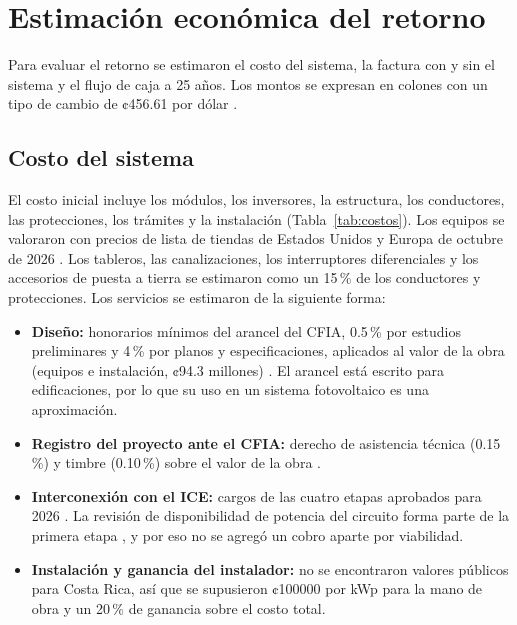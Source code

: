 \section{Estimación económica del retorno}\label{sec:economia}

Para evaluar el retorno se estimaron el costo del sistema, la factura con y sin el sistema y el flujo de caja a 25 años. Los montos se expresan en colones con un tipo de cambio de ¢456.61 por dólar \cite{tipo_cambio}.

\subsection{Costo del sistema}

El costo inicial incluye los módulos, los inversores, la estructura, los conductores, las protecciones, los trámites y la instalación (Tabla~\ref{tab:costos}). Los equipos se valoraron con precios de lista de tiendas de Estados Unidos y Europa de octubre de 2026 \cite{precio_modulo, precio_inversor, precios_bos}. Los tableros, las canalizaciones, los interruptores diferenciales y los accesorios de puesta a tierra se estimaron como un 15\,\% de los conductores y protecciones. Los servicios se estimaron de la siguiente forma:
\begin{itemize}
\item \textbf{Diseño:} honorarios mínimos del arancel del CFIA, 0.5\,\% por estudios preliminares y 4\,\% por planos y especificaciones, aplicados al valor de la obra (equipos e instalación, ¢94.3 millones) \cite{cfia_arancel}. El arancel está escrito para edificaciones, por lo que su uso en un sistema fotovoltaico es una aproximación.
\item \textbf{Registro del proyecto ante el CFIA:} derecho de asistencia técnica (0.15\,\%) y timbre (0.10\,\%) sobre el valor de la obra \cite{cfia_registro, cfia_resumen}.
\item \textbf{Interconexión con el ICE:} cargos de las cuatro etapas aprobados para 2026 \cite{ice_der}. La revisión de disponibilidad de potencia del circuito forma parte de la primera etapa \cite{ice_guia2021}, y por eso no se agregó un cobro aparte por viabilidad.
\item \textbf{Instalación y ganancia del instalador:} no se encontraron valores públicos para Costa Rica, así que se supusieron ¢\num{100000} por kWp para la mano de obra y un 20\,\% de ganancia sobre el costo total.
\end{itemize}
